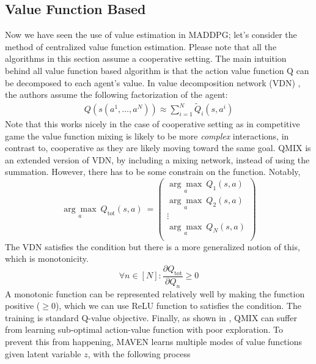 \subsection{Value Function Based}
Now we have seen the use of value estimation in MADDPG; let's consider the method of centralized value function estimation. Please note that all the algorithms in this section assume a cooperative setting. The main intuition behind all value function based algorithm is that the action value function Q can be decomposed to each agent's value. In value decomposition network (VDN) \cite{sunehag2017value}, the authors assume the following factorization of the agent:
\begin{equation}
\begin{aligned}
Q(s (a^1, \dots, a^N)) \approx \sum^N_{i=1} \tilde{Q}_i(s, a^i)
\end{aligned} 
\end{equation}
Note that this works nicely in the case of cooperative setting as in competitive game the value function mixing is likely to be more \textit{complex} interactions, in contrast to, cooperative as they are likely moving toward the same goal. QMIX \cite{rashid2018qmix} is an extended version of VDN, by including a mixing network, instead of using the summation. However, there has to be some constrain on the function. Notably, 
\begin{equation}
\underset{a}{\arg\max} \ Q_{\text{tot}}(s, a) \ = \begin{pmatrix}
	\underset{a}{\arg\max} \ Q_1(s, a) \\ \underset{a}{\arg\max} \ Q_2(s, a) \\ \vdots \\ \underset{a}{\arg\max} \ Q_N(s, a) \\
\end{pmatrix}
\end{equation}
The VDN satisfies the condition but there is a more generalized notion of this, which is monotonicity.
\begin{equation}
\forall n \in [N] : \frac{\partial Q_{\text{tot}}}{\partial Q_{n}} \ge 0
\end{equation}
A monotonic function can be represented relatively well \cite{dugas2009incorporating} by making the function positive ($\ge 0$), which we can use ReLU function \cite{nair2010rectified} to satisfies the condition. The training is standard Q-value objective. Finally, as shown in \cite{mahajan2019maven}, QMIX can suffer from learning sub-optimal action-value function with poor exploration. To prevent this from happening, MAVEN \cite{mahajan2019maven} learns multiple modes of value functions given latent variable $z$, with the following process
